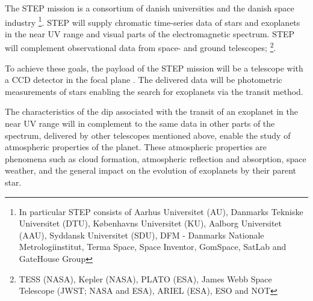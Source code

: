 \documentclass[../main.tex]{subfiles}
\begin{document}
	The STEP mission is a consortium of danish universities and the danish space industry \footnote{In particular STEP consists of \cite{stepprodex} Aarhus Universitet (AU), Danmarks Tekniske Universitet (DTU), Københavns Universitet (KU), Aalborg Universitet (AAU), Syddansk Universitet (SDU), DFM - Danmarks Nationale Metrologiinstitut, Terma Space, Space Inventor, GomSpace, SatLab and GateHouse Group}. STEP will supply chromatic time-series data of stars and exoplanets in the near UV range and visual parts of the electromagnetic spectrum. STEP will complement observational data from space- and ground telescopes; \footnote{TESS (NASA), Kepler (NASA), PLATO (ESA), James Webb Space Telescope (JWST; NASA and ESA), ARIEL (ESA), ESO and NOT}.
	
	To achieve these goals, the payload of the STEP mission will be a telescope with a CCD detector in the focal plane \cite{stepprodex}. 
	The delivered data will be photometric measurements of stars enabling the search for exoplanets via the transit method.
	
	The characteristics of the dip associated with the transit of an exoplanet in the near UV range will in complement to the same data in other parts of the spectrum, delivered by other telescopes mentioned above, enable the study of atmospheric properties of the planet. These atmospheric properties are phenomena such as cloud formation, atmospheric reflection and absorption, space weather, and the general impact on the evolution of exoplanets by their parent star. 
	
\end{document}
